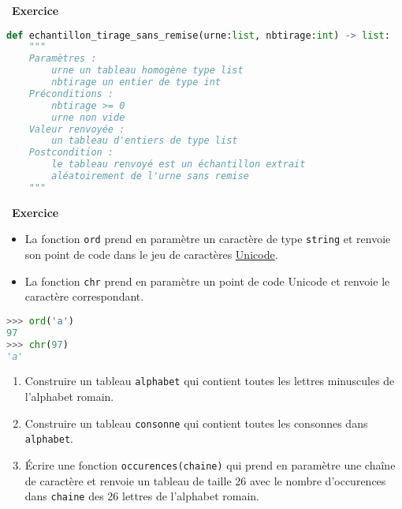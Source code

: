 \documentclass[
  11pt,
]{article}
\newcommand{\passthrough}[1]{#1}
\providecommand{\tightlist}{%
  \setlength{\itemsep}{0pt}\setlength{\parskip}{0pt}}
\newcounter{exo}
\newenvironment{exercice}[1]
{\par \medskip   \addtocounter{exo}{1} \noindent  
\begin{bclogo}[arrondi =0.1,   noborder = true, logo=\bccrayon, marge=4]{~\textbf{Exercice} \textbf{\theexo} {\itshape #1} }  \par}
{
\end{bclogo}
 \par \bigskip }
\newcounter{def}
\begin{document}
\begin{exercice}{}
\begin{enumerate}
\begin{lstlisting}[language=Python]
def echantillon_tirage_sans_remise(urne:list, nbtirage:int) -> list:
    """ 
    Paramètres :
        urne un tableau homogène type list
        nbtirage un entier de type int
    Préconditions :
        nbtirage >= 0
        urne non vide
    Valeur renvoyée :
        un tableau d'entiers de type list
    Postcondition :
        le tableau renvoyé est un échantillon extrait
        aléatoirement de l'urne sans remise
    """
\end{lstlisting}
\end{enumerate}

\end{exercice}

\begin{exercice}{}

\begin{itemize}
\tightlist
\item
  La fonction \passthrough{\lstinline!ord!} prend en paramètre un
  caractère de type \passthrough{\lstinline!string!} et renvoie son
  point de code dans le jeu de caractères
  \href{https://fr.wikipedia.org/wiki/Unicode}{Unicode}.
\item
  La fonction \passthrough{\lstinline!chr!} prend en paramètre un point
  de code Unicode et renvoie le caractère correspondant.
\end{itemize}

\begin{lstlisting}[language=Python]
>>> ord('a')
97
>>> chr(97)
'a'
\end{lstlisting}

\begin{enumerate}
\def\labelenumi{\arabic{enumi}.}
\tightlist
\item
  Construire un tableau \passthrough{\lstinline!alphabet!} qui contient
  toutes les lettres minuscules de l'alphabet romain.
\item
  Construire un tableau \passthrough{\lstinline!consonne!} qui contient
  toutes les consonnes dans \passthrough{\lstinline!alphabet!}.
\item
  Écrire une fonction \passthrough{\lstinline!occurences(chaine)!} qui
  prend en paramètre une chaîne de caractère et renvoie un tableau de
  taille 26 avec le nombre d'occurences dans
  \passthrough{\lstinline!chaine!} des 26 lettres de l'alphabet romain.
\end{enumerate}

\end{exercice}
\end{document}
